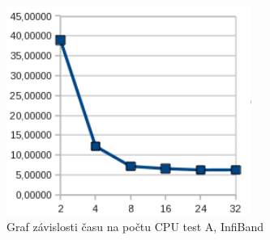 \documentclass[12pt]{article}
\begin{document}
\appendix


\begin{figure}[ht]
\begin{center}
\includegraphics[width=8cm]{grafy-zprava/testAinfib.png}
\caption{Graf závislosti času na počtu CPU test A, InfiBand}
\label{fig:testAinfib}
\end{center}
\end{figure}
\end{document}
